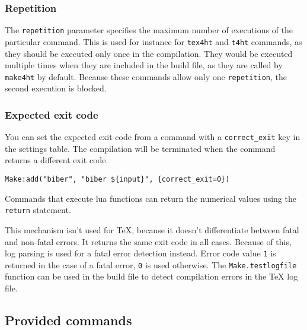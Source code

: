 \hypertarget{repetition}{%
\subsubsection{Repetition}\label{repetition}}

The \texttt{repetition} parameter specifies the maximum number of
executions of the particular command. This is used for instance for
\texttt{tex4ht} and \texttt{t4ht} commands, as they should be executed
only once in the compilation. They would be executed multiple times when
they are included in the build file, as they are called by
\texttt{make4ht} by default. Because these commands allow only one
\texttt{repetition}, the second execution is blocked.

\hypertarget{expected-exit-code}{%
\subsubsection{Expected exit code}\label{expected-exit-code}}

You can set the expected exit code from a command with a
\texttt{correct\_exit} key in the settings table. The compilation will
be terminated when the command returns a different exit code.

\begin{verbatim}
Make:add("biber", "biber ${input}", {correct_exit=0})
\end{verbatim}

Commands that execute lua functions can return the numerical values
using the \texttt{return} statement.

This mechanism isn't used for \TeX, because it doesn't differentiate
between fatal and non-fatal errors. It returns the same exit code in all
cases. Because of this, log parsing is used for a fatal error detection
instead. Error code value \texttt{1} is returned in the case of a fatal
error, \texttt{0} is used otherwise. The \texttt{Make.testlogfile}
function can be used in the build file to detect compilation errors in
the TeX log file.

\hypertarget{provided-commands}{%
\subsection{Provided commands}\label{provided-commands}}

